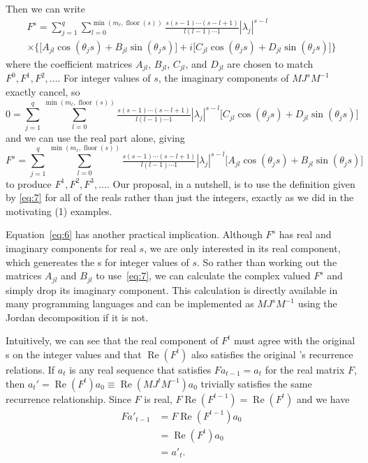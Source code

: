 \documentclass[12pt,fleqn]{article}
\renewcommand{\Re}{\operatorname{Re}}
\DeclareMathOperator{\floor}{floor}
\newcommand{\AR}{\allcaps{AR}}
\begin{document}
Then we can write
\begin{multline}\label{eq:6}
  F^s =
  \sum_{j = 1}^q \sum_{l=0}^{\min(m_\ell, \floor(s))} \tfrac{s(s-1)\cdots(s-l+1)}{l (l - 1) \cdots 1} |\lambda_j|^{s-l} \\
  \times\Big\{\big[A_{jl} \cos(\theta_j s) + B_{jl} \sin(\theta_j s)\big] + i\big[C_{jl} \cos(\theta_j s) + D_{jl} \sin(\theta_j s)\big]\Big\}
\end{multline}
where the coefficient matrices $A_{jl}$, $B_{jl}$, $C_{jl}$, and
$D_{jl}$ are chosen to match $F^0, F^1, F^2,\dots$. 
For integer values of $s$, the imaginary components of $M J^s M^{-1}$
exactly cancel, so
\begin{equation*}
  0 = \sum_{j = 1}^q \sum_{l=0}^{\min(m_\ell, \floor(s))} \tfrac{s(s-1)\cdots(s-l+1)}{l (l - 1) \cdots 1} |\lambda_j|^{s-l}
  \big[C_{jl} \cos(\theta_j s) + D_{jl} \sin(\theta_j s)\big]
\end{equation*}
and we can use the real part alone, giving
\begin{equation}\label{eq:7}
  F^s =
  \sum_{j = 1}^q \sum_{l=0}^{\min(m_\ell, \floor(s))} \tfrac{s(s-1)\cdots(s-l+1)}{l (l - 1) \cdots 1} |\lambda_j|^{s-l} \big[A_{jl} \cos(\theta_j s) + B_{jl} \sin(\theta_j s)\big]
\end{equation}
to produce $F^1, F^2, F^3,\dots$. Our proposal, in a nutshell, is to
use the definition given by \eqref{eq:7} for all of the reals rather
than just the integers, exactly as we did in the motivating \AR(1)
examples.

Equation~\eqref{eq:6} has another practical implication. Although
$F^s$ has real and imaginary components for real $s$, we are only
interested in its real component, which genereates the \IRF s for
integer values of $s$. So rather than working out the matrices
$A_{jl}$ and $B_{jl}$ to use~\eqref{eq:7}, we can calculate the
complex valued $F^s$ and simply drop its imaginary component. This
calculation is directly available in many programming languages and
can be implemented as $M J^s M^{-1}$ using the Jordan decomposition if
it is not.

Intuitively, we can see that the real component of $F^t$ must agree
with the original \IRF s on the integer values and that $\Re(F^t)$
also satisfies the original \VAR's recurrence relations. If $a_t$ is
any real sequence that satisfies $F a_{t-1} = a_t$ for the real matrix
$F$, then $a_t' = \Re(F^t) a_{0} \equiv \Re(M J^t M^{-1}) a_0$
trivially satisfies the same recurrence relationship. Since $F$ is
real, $F \Re(F^{t-1}) = \Re(F^t)$ and we have
\begin{align*}
F a'_{t-1} &= F \Re(F^{t-1}) a_{0} \\
&= \Re(F^t) a_0 \\
&= a'_t.
\end{align*}
\end{document}
